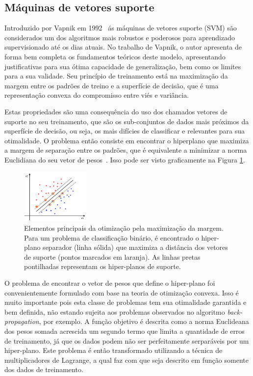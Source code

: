 \documentclass[conference]{IEEEtran}
\begin{document}
	   
    
	\subsection{Máquinas de vetores suporte}
	Introduzido por Vapnik em 1992~\cite{boser1992training} ás máquinas de vetores suporte (SVM) são considerados um dos algoritmos mais robustos e poderosos para aprendizado supervisionado até os dias atuais. No trabalho de Vapnik, o autor apresenta de forma bem completa os fundamentos teóricos deste modelo, apresentando justificativas para sua ótima capacidade de generalização, bem como os limites para a sua validade. Seu princípio de treinamento está na maximização da margem entre os padrões de treino e a superfície de decisão, que é uma representação convexa do compromisso entre viés e variância.
	
	Estas propriedades são uma consequência do uso dos chamados vetores de suporte no seu treinamento, que são os sub-conjuntos de dados mais próximos da superfície de decisão, ou seja, os mais difícies de classificar e relevantes para sua otimalidade. O problema então consiste em encontrar o hiperplano que maximiza a margem de separação entre os padrões, que é equivalente a minimizar a norma Euclidiana do seu vetor de pesos~\cite{haykin2007neural}. Isso pode ser visto graficamente na Figura \ref{fig:svm}.
	
	\begin{figure}[thpbh]
		\centering
		\includegraphics[width=0.3\textwidth]{svm-hp.png}
		\caption{Elementos principais da otimização pela maximização da margem. Para um problema de classificação binário, é encontrado o hiper-plano separador (linha sólida) que maximiza a distância dos vetores de suporte (pontos marcados em laranja). As linhas pretas pontilhadas representam os hiper-planos de suporte.}
		\label{fig:svm}
	\end{figure}
	
	O problema de encontrar o vetor de pesos que define o hiper-plano foi convenientemente formulado com base na teoria de otimização convexa. Isso é muito importante pois esta classe de problemas tem sua otimalidade garantida e bem definida, não estando sujeita aos problemas observados no algoritmo \textit{back-propagation}, por exemplo. A função objetivo é descrita como a norma Euclideana dos pesos somada acrescida um segundo termo que limita a quantidade de erros de treinamento, já que os dados podem não ser perfeitamente serparáveis por um hiper-plano. Este problema é então transformado utilizando a técnica de multiplicadores de Lagrange, a qual faz com que seja descrito em função somente dos dados de treinamento.
	
\end{document}
